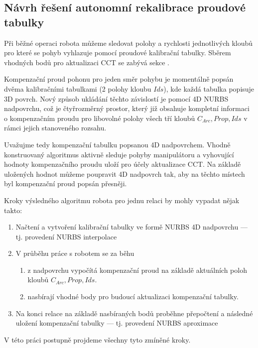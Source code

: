 \subsection{Návrh řešení autonomní rekalibrace proudové tabulky}
Při běžné operaci robota můžeme sledovat polohy a rychlosti jednotlivých kloubů pro které se pohyb vyhlazuje pomocí proudové kalibrační tabulky. Sběrem vhodných bodů pro aktualizaci CCT se zabývá sekce .
\par
Kompenzační proud pohonu pro jeden směr pohybu je momentálně popsán dvěma kalibračními tabulkami (2 polohy kloubu $Ids$), kde každá tabulka popisuje 3D povrch. Nový způsob ukládání těchto závislostí je pomocí 4D NURBS nadpovrchu, což je čtyřrozměrný prostor, který již obsahuje kompletní informaci o kompenzačním proudu pro libovolné polohy všech tří kloubů $C_{Arc}, Prop, Ids$ v rámci jejich stanoveného rozsahu.
\par
Uvažujme tedy kompenzační tabulku popsanou 4D nadpovrchem. Vhodně konstruovaný algoritmus aktivně sleduje pohyby manipulátoru a vyhovující hodnoty kompenzačního proudu uloží pro účely aktualizace CCT. Na základě uložených hodnot můžeme poupravit 4D nadpovrch tak, aby na těchto místech byl kompenzační proud popsán přesněji.
\par
Kroky výsledného algoritmu robota pro jednu relaci by mohly vypadat nějak takto:
\begin{enumerate}
    \item Načtení a vytvoření kalibrační tabulky ve formě NURBS 4D nadpovrchu --- tj. provedení NURBS interpolace 
    \item \label{item:průběh práce} V průběhu práce s robotem se za běhu
          \begin{enumerate}
              \item z nadpovrchu vypočítá kompenzační proud na základě aktuálních poloh kloubů $C_{Arc}, Prop, Ids$.
              \item nasbírají vhodné body pro budoucí aktualizaci kompenzační tabulky.
          \end{enumerate}
    \item \label{item:konec relace} Na konci relace na základě nasbíraných bodů proběhne přepočtení a následné uložení kompenzační tabulky  --- tj. provedení NURBS aproximace 
\end{enumerate}
V této práci postupně projdeme všechny tyto zmíněné kroky.